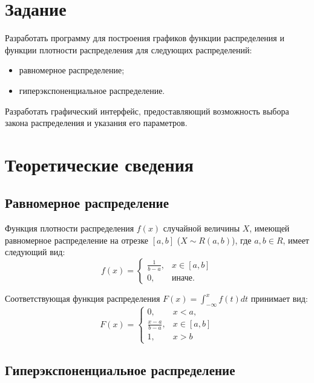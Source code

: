 \documentclass[14pt, a4paper]{extarticle}
\begin{document}


\setcounter{page}{2}

\section{Задание}
Разработать программу для построения графиков функции распределения и функции плотности распределения для следующих распределений: 
\begin{itemize}
	\item равномерное распределение;
	\item гиперэкспоненциальное распределение.
\end{itemize} 

Разработать графический интерфейс, предоставляющий возможность выбора закона распределения и указания его параметров.

\section{Теоретические сведения}

\subsection{Равномерное распределение}

Функция плотности распределения $f(x)$ случайной величины $X$, имеющей равномерное распределение на отрезке $[a, b]$ ($X \sim R(a, b)$), где $a, b \in R$, имеет следующий вид:
\begin{equation}
	f(x)=\begin{cases}
		\frac{1}{b - a}, & x \in [a, b] \\
		0, & \text{иначе}.
	\end{cases}
\end{equation}

Соответствующая функция распределения $F(x) = \int_{-\infty}^{x}f(t)dt$ принимает вид: 
\begin{equation}
	F(x)=\begin{cases}
		0, & x < a, \\
		\frac{x - a}{b - a}, & x \in [a, b] \\
		1, & x > b
	\end{cases}
\end{equation}


\subsection{Гиперэкспоненциальное распределение}
\end{document}
